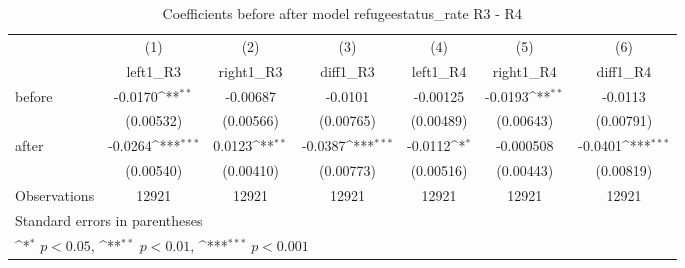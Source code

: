 \begin{table}[htbp]\centering
\def\sym#1{\ifmmode^{#1}\else\(^{#1}\)\fi}
\caption{Coefficients before after model refugeestatus\_rate R3 - R4}
\begin{tabular}{l*{6}{c}}
\hline\hline
                    &\multicolumn{1}{c}{(1)}&\multicolumn{1}{c}{(2)}&\multicolumn{1}{c}{(3)}&\multicolumn{1}{c}{(4)}&\multicolumn{1}{c}{(5)}&\multicolumn{1}{c}{(6)}\\
                    &\multicolumn{1}{c}{left1\_R3}&\multicolumn{1}{c}{right1\_R3}&\multicolumn{1}{c}{diff1\_R3}&\multicolumn{1}{c}{left1\_R4}&\multicolumn{1}{c}{right1\_R4}&\multicolumn{1}{c}{diff1\_R4}\\
\hline
before              &     -0.0170\sym{**} &    -0.00687         &     -0.0101         &    -0.00125         &     -0.0193\sym{**} &     -0.0113         \\
                    &   (0.00532)         &   (0.00566)         &   (0.00765)         &   (0.00489)         &   (0.00643)         &   (0.00791)         \\
[1em]
after               &     -0.0264\sym{***}&      0.0123\sym{**} &     -0.0387\sym{***}&     -0.0112\sym{*}  &   -0.000508         &     -0.0401\sym{***}\\
                    &   (0.00540)         &   (0.00410)         &   (0.00773)         &   (0.00516)         &   (0.00443)         &   (0.00819)         \\
\hline
Observations        &       12921         &       12921         &       12921         &       12921         &       12921         &       12921         \\
\hline\hline
\multicolumn{7}{l}{\footnotesize Standard errors in parentheses}\\
\multicolumn{7}{l}{\footnotesize \sym{*} \(p<0.05\), \sym{**} \(p<0.01\), \sym{***} \(p<0.001\)}\\
\end{tabular}
\end{table}

